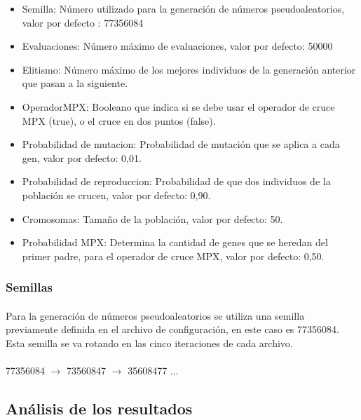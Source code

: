 		\begin{itemize}
			
			\item Semilla: Número utilizado para la generación de números pseudoaleatorios, valor por defecto : 77356084
			\item Evaluaciones:  Número máximo de evaluaciones, valor por defecto: 50000
			\item Elitismo: Número máximo de los mejores individuos de la generación anterior que pasan a la siguiente.
			\item OperadorMPX: Booleano que indica si se debe usar el operador de cruce MPX (true), o el cruce en dos puntos (false).
			\item Probabilidad de mutacion: Probabilidad de mutación que se aplica a cada gen, valor por defecto: 0,01.
			\item Probabilidad de reproduccion: Probabilidad de que dos individuos de la población se crucen, valor por defecto: 0,90.
			\item Cromosomas: Tamaño de la población, valor por defecto: 50.
			\item Probabilidad MPX: Determina la cantidad de genes que se heredan del primer padre, para el operador de cruce MPX, valor por defecto: 0,50.
			
		\end{itemize}

	
	\subsubsection{Semillas}
	
	\paragraph{}Para la generación de números pseudoaleatorios se utiliza una semilla previamente definida en el archivo de configuración, en este caso es 77356084. Esta semilla se va rotando en las cinco iteraciones de cada archivo.
	
	
	\paragraph{} 77356084 $\rightarrow$ 73560847 $\rightarrow$ 35608477  ...
	
	
	\subsection{Análisis de los resultados}
	
